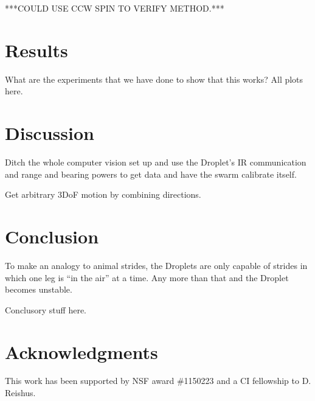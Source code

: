 \documentclass[letterpaper, 10pt, conference]{ieeeconf}
\begin{document}
***COULD USE CCW SPIN TO VERIFY METHOD.***



\section{Results}
What are the experiments that we have done to show that this works? All plots here.




\section{Discussion}
Ditch the whole computer vision set up and use the Droplet's IR communication and range and bearing powers to get data and have the swarm calibrate itself.

Get arbitrary 3DoF motion by combining directions.

\section{Conclusion}
To make an analogy to animal strides, the Droplets are only capable of strides in which one leg is ``in the air'' at a time. Any more than that and the Droplet becomes unstable.

Conclusory stuff here.

\section*{Acknowledgments}
This work has been supported by NSF award \#1150223 and a CI fellowship to D. Reishus.




\end{document}
